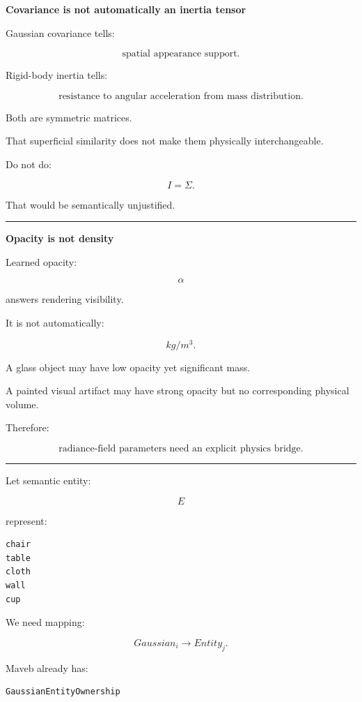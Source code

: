 \textbf{Covariance is not automatically an inertia tensor}

Gaussian covariance tells:

\[
\boxed{
\text{spatial appearance support}.
}
\]

Rigid-body inertia tells:

\[
\boxed{
\text{resistance to angular acceleration from mass distribution}.
}
\]

Both are symmetric matrices.

That superficial similarity does not make them physically interchangeable.

Do not do:

\[
I=\Sigma.
\]

That would be semantically unjustified.

\begin{center}\rule{0.5\linewidth}{0.5pt}\end{center}

\textbf{Opacity is not density}

Learned opacity:

\[
\alpha
\]

answers rendering visibility.

It is not automatically:

\[
kg/m^3.
\]

A glass object may have low opacity yet significant mass.

A painted visual artifact may have strong opacity but no corresponding physical volume.

Therefore:

\[
\boxed{
\text{radiance-field parameters need an explicit physics bridge}.
}
\]

\begin{center}\rule{0.5\linewidth}{0.5pt}\end{center}

Let semantic entity:

\[
E
\]

represent:

\protect{}\label{f0n5qg}%
\begin{verbatim}
chair
table
cloth
wall
cup
\end{verbatim}

We need mapping:

\[
\boxed{
Gaussian_i
\rightarrow
Entity_j.
}
\]

Maveb already has:

\begin{verbatim}
GaussianEntityOwnership
\end{verbatim}

